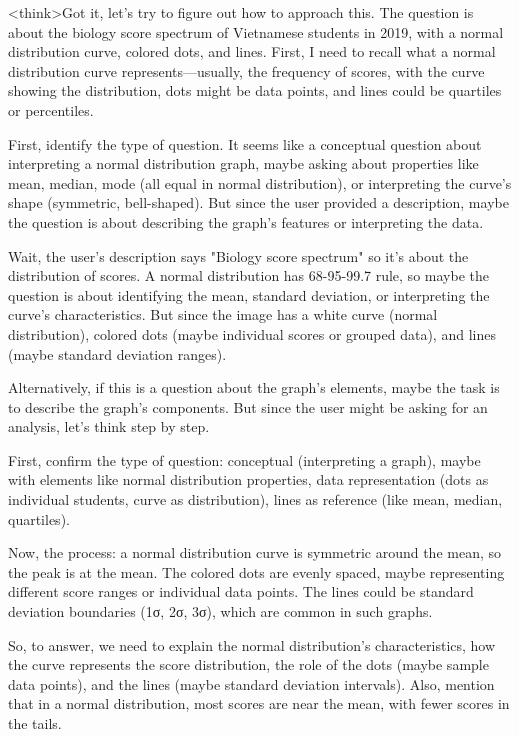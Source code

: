 <think>Got it, let's try to figure out how to approach this. The question is about the biology score spectrum of Vietnamese students in 2019, with a normal distribution curve, colored dots, and lines. First, I need to recall what a normal distribution curve represents—usually, the frequency of scores, with the curve showing the distribution, dots might be data points, and lines could be quartiles or percentiles.

First, identify the type of question. It seems like a conceptual question about interpreting a normal distribution graph, maybe asking about properties like mean, median, mode (all equal in normal distribution), or interpreting the curve's shape (symmetric, bell-shaped). But since the user provided a description, maybe the question is about describing the graph's features or interpreting the data.

Wait, the user's description says "Biology score spectrum" so it's about the distribution of scores. A normal distribution has 68-95-99.7 rule, so maybe the question is about identifying the mean, standard deviation, or interpreting the curve's characteristics. But since the image has a white curve (normal distribution), colored dots (maybe individual scores or grouped data), and lines (maybe standard deviation ranges).

Alternatively, if this is a question about the graph's elements, maybe the task is to describe the graph's components. But since the user might be asking for an analysis, let's think step by step.

First, confirm the type of question: conceptual (interpreting a graph), maybe with elements like normal distribution properties, data representation (dots as individual students, curve as distribution), lines as reference (like mean, median, quartiles).

Now, the process: a normal distribution curve is symmetric around the mean, so the peak is at the mean. The colored dots are evenly spaced, maybe representing different score ranges or individual data points. The lines could be standard deviation boundaries (1σ, 2σ, 3σ), which are common in such graphs.

So, to answer, we need to explain the normal distribution's characteristics, how the curve represents the score distribution, the role of the dots (maybe sample data points), and the lines (maybe standard deviation intervals). Also, mention that in a normal distribution, most scores are near the mean, with fewer scores in the tails.

